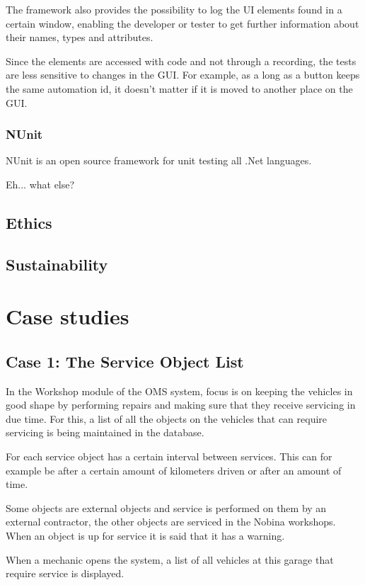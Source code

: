 \documentclass{article}
\begin{document}
			The framework also provides the possibility to log the UI elements found in a certain window, enabling the developer or tester to get further information about their names, types and attributes.

			Since the elements are accessed with code and not through a recording, the tests are less sensitive to changes in the GUI. For example, as a long as a button keeps the same automation id, it doesn't matter if it is moved to another place on the GUI. 

			\subsubsection{NUnit}
			NUnit is an open source framework for unit testing all .Net languages. \cite{nunit}

			Eh... what else?


		\subsection{Ethics}

		\subsection{Sustainability}


	\section{Case studies}
		\subsection{Case 1: The Service Object List}
		In the Workshop module of the OMS system, focus is on keeping the vehicles in good shape by performing repairs and making sure that they receive servicing in due time. For this, a list of all the objects on the vehicles that can require servicing is being maintained in the database. 

		For each service object has a certain interval between services. This can for example be after a certain amount of kilometers driven or after an amount of time. 

		Some objects are external objects and service is performed on them by an external contractor, the other objects are serviced in the Nobina workshops. When an object is up for service it is said that it has a warning.

		When a mechanic opens the system, a list of all vehicles at this garage that require service is displayed.
\end{document}
